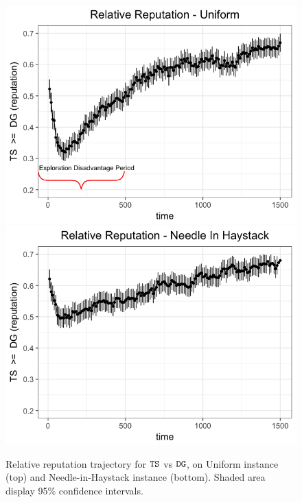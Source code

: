 \documentclass[../competing_bandits.tex]{subfiles}
\begin{document}
\begin{figure}[ht]
\includegraphics[scale=0.35]{figures/relative_uniform_annotated_plot}
\includegraphics[scale=0.35]{figures/relative_nih_ts_dg.png}
\caption{Relative reputation trajectory for $\mathtt{TS}$ vs $\mathtt{DG}$, on Uniform instance (top) and Needle-in-Haystack instance (bottom). Shaded area display 95\% confidence intervals.}
\label{relative_rep_plots}
\end{figure}
\end{document}
